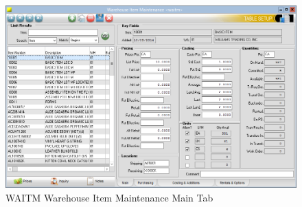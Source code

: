 \begin{enumerate}
	
	\begin{figure}[H]
		\includegraphics[width=\textwidth]{../img/image62}
		\caption{WAITM Warehouse Item Maintenance Main Tab}
	\end{figure}
	

\end{enumerate}
